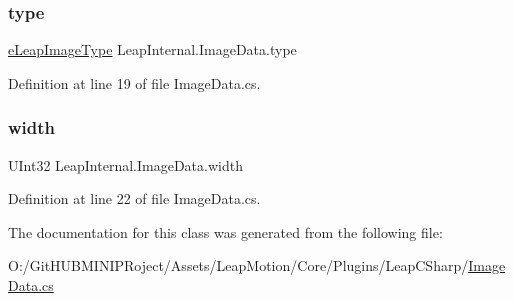 \mbox{\label{class_leap_internal_1_1_image_data_acba9a8c08947e1b5e8c3a3bb7403d737}} 
\subsubsection{\texorpdfstring{type}{type}}
{\footnotesize\ttfamily \mbox{\hyperlink{namespace_leap_internal_aa8c735677264cfdbefdd598adb92a1f5}{e\+Leap\+Image\+Type}} Leap\+Internal.\+Image\+Data.\+type\hspace{0.3cm}{\ttfamily [get]}}



Definition at line 19 of file Image\+Data.\+cs.

\mbox{\label{class_leap_internal_1_1_image_data_ad31e62a08aa17eed9c536d7f2614e06b}} 
\subsubsection{\texorpdfstring{width}{width}}
{\footnotesize\ttfamily U\+Int32 Leap\+Internal.\+Image\+Data.\+width\hspace{0.3cm}{\ttfamily [get]}}



Definition at line 22 of file Image\+Data.\+cs.



The documentation for this class was generated from the following file\+:\begin{DoxyCompactItemize}
\item 
O\+:/\+Git\+H\+U\+B\+M\+I\+N\+I\+P\+Roject/\+Assets/\+Leap\+Motion/\+Core/\+Plugins/\+Leap\+C\+Sharp/\mbox{\hyperlink{_image_data_8cs}{Image\+Data.\+cs}}\end{DoxyCompactItemize}
